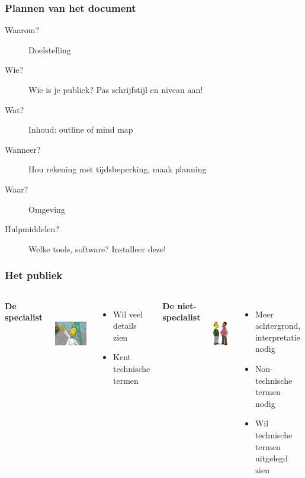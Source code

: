 \documentclass{beamer}
\begin{document}
\begin{frame}
  \frametitle{Plannen van het document}

  \begin{description}
    \item[Waarom?] Doelstelling
    \item[Wie?] Wie is je publiek? Pas schrijfstijl en niveau aan!
    \item[Wat?] Inhoud: outline of mind map
    \item[Wanneer?] Hou rekening met tijdsbeperking, maak planning
    \item[Waar?] Omgeving
    \item[Hulpmiddelen?] Welke tools, software? Installeer deze!
  \end{description}
\end{frame}

\begin{frame}
  \frametitle{Het publiek}

  \begin{columns}[c]

    \centering

    \textbf{De specialist}

    \includegraphics[height=3cm]{img/oef2-04.png}

    \begin{itemize}
      \item Wil veel details zien
      \item Kent technische termen
    \end{itemize}


    \centering

    \textbf{De niet-specialist}

    \includegraphics[height=3cm]{img/oef2-05}

    \begin{itemize}
      \item Meer achtergrond, interpretatie nodig
      \item Non-technische termen nodig
      \item Wil technische termen uitgelegd zien
    \end{itemize}
  \end{columns}
\end{frame}
\end{document}
